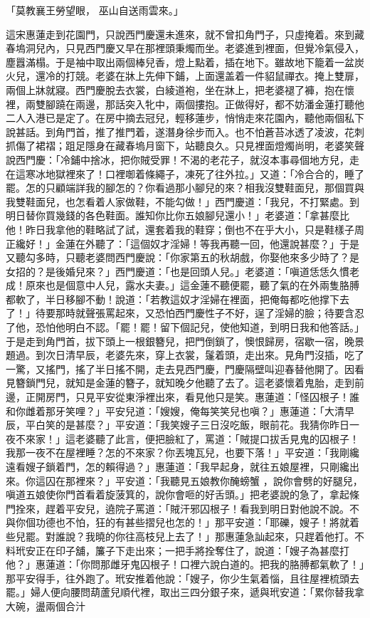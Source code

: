 「莫教襄王勞望眼，  巫山自送雨雲來。」

這宋惠蓮走到花園門，只說西門慶還未進來，就不曾扣角門子，只虛掩着。來到藏春塢洞兒內，只見西門慶又早在那裡頭秉燭而坐。老婆進到裡面，但覺冷氣侵入，塵囂滿榻。于是袖中取出兩個棒兒香，燈上點着，插在地下。雖故地下籠着一盆炭火兒，還冷的打競。老婆在牀上先伸下鋪，上面還盖着一件貂鼠禪衣。掩上雙扉，兩個上牀就寢。西門慶脫去衣裳，白綾道袍，坐在牀上，把老婆褪了褲，抱在懷裡，兩雙腳蹺在兩邊，那話突入牝中，兩個摟抱。正做得好，都不妨潘金蓮打聽他二人入港已是定了。在房中摘去冠兒，輕移蓮步，悄悄走來花園內，聽他兩個私下說甚話。到角門首，推了推門着，遂潛身徐步而入。也不怕蒼苔冰透了凌波，花刺抓傷了裙褶；跙足隱身在藏春塢月窗下，站聽良久。只見裡面燈燭尚明，老婆笑聲說西門慶：「冷鋪中捨冰，把你賊受罪！不渴的老花子，就沒本事尋個地方兒，走在這寒冰地獄裡來了！口裡啣着條繩子，凍死了往外拉。」又道：「冷合合的，睡了罷。怎的只顧端詳我的腳怎的？你看過那小腳兒的來？相我沒雙鞋面兒，那個買與我雙鞋面兒，也怎看着人家做鞋，不能勾做！」西門慶道：「我兒，不打緊處。到明日替你買幾錢的各色鞋面。誰知你比你五娘腳兒還小！」老婆道：「拿甚麼比他！昨日我拿他的鞋略試了試，還套着我的鞋穿；倒也不在乎大小，只是鞋樣子周正纔好！」金蓮在外聽了：「這個奴才淫婦！等我再聽一回，他還說甚麼？」于是又聽勾多時，只聽老婆問西門慶說：「你家第五的秋胡戲，你娶他來多少時了？是女招的？是後婚兒來？」西門慶道：「也是回頭人兒。」老婆道：「嗔道恁恁久慣老成！原來也是個意中人兒，露水夫妻。」這金蓮不聽便罷，聽了氣的在外兩隻胳膊都軟了，半日移腳不動！說道：「若教這奴才淫婦在裡面，把俺每都吃他撑下去了！」待要那時就聲張罵起來，又恐怕西門慶性子不好，逞了淫婦的臉；待要含忍了他，恐怕他明白不認。「罷！罷！留下個記兒，使他知道，到明日我和他答話。」于是走到角門首，拔下頭上一根銀簪兒，把門倒鎖了，懊恨歸房，宿歇一宿，晚景題過。到次日清早辰，老婆先來，穿上衣裳，鬔着頭，走出來。見角門沒插，吃了一驚，又搖門，搖了半日搖不開，走去見西門慶，門慶隔壁叫迎春替他開了。因看見簪鎖門兒，就知是金蓮的簪子，就知晚夕他聽了去了。這老婆懷着鬼胎，走到前邊，正開房門，只見平安從東淨裡出來，看見他只是笑。惠蓮道：「怪囚根子！誰和你雌着那牙笑哩？」平安兒道：「嫂嫂，俺每笑笑兒也嗔？」惠蓮道：「大清早辰，平白笑的是甚麼？」平安道：「我笑嫂子三日沒吃飯，眼前花。我猜你昨日一夜不來家！」這老婆聽了此言，便把臉紅了，罵道：「賊提口拔舌見鬼的囚根子！我那一夜不在屋裡睡？怎的不來家？你丟塊瓦兒，也要下落！」平安道：「我剛纔遠看嫂子鎖着門，怎的賴得過？」惠蓮道：「我早起身，就往五娘屋裡，只剛纔出來。你這囚在那裡來？」平安道：「我聽見五娘教你醃螃蟹 ，說你會劈的好腿兒，嗔道五娘使你門首看着旋菠箕的，說你會咂的好舌頭。」把老婆說的急了，拿起條門拴來，趕着平安兒，遶院子罵道：「賊汗邪囚根子！看我到明日對他說不說。不與你個功德也不怕，狂的有甚些摺兒也怎的！」那平安道：「耶礫，嫂子！將就着些兒罷。對誰說？我曉的你往高枝兒上去了！」那惠蓮急訕起來，只趕着他打。不料玳安正在印子舖，簾子下走出來；一把手將拴奪住了，說道：「嫂子為甚麼打他？」惠蓮道：「你問那雌牙鬼囚根子！口裡六說白道的。把我的胳膊都氣軟了！」那平安得手，往外跑了。玳安推着他說：「嫂子，你少生氣着惱，且往屋裡梳頭去罷。」婦人便向腰問葫蘆兒順代裡，取出三四分銀子來，遞與玳安道：「累你替我拿大碗，盪兩個合汁 